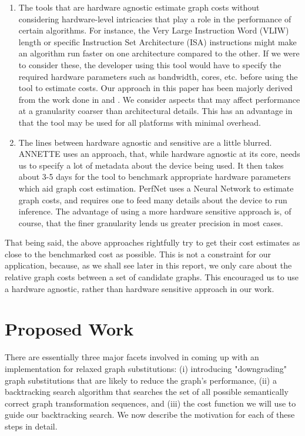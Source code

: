 \documentclass[12pt,a4paper,twoside,openright,bibliography=totocnumbered]{report}
\begin{document}
\begin{enumerate}
    \item The tools that are hardware agnostic estimate graph costs without considering hardware-level intricacies that play a role in the performance of certain algorithms. For instance, the Very Large Instruction Word (VLIW) length or specific Instruction Set Architecture (ISA) instructions might make an algorithm run faster on one architecture compared to the other. If we were to consider these, the developer using this tool would have to specify the required hardware parameters such as bandwidth, cores, etc. before using the tool to estimate costs. Our approach in this paper has been majorly derived from the work done in \cite{qi2017paleo} and \cite{osterwind2022hardware}. We consider aspects that may affect performance at a granularity coarser than architectural details. This has an advantage in that the tool may be used for all platforms with minimal overhead. 
    \item The lines between hardware agnostic and sensitive are a little blurred. ANNETTE \cite{wess2020annette} uses an approach, that, while hardware agnostic at its core, needs us to specify a lot of metadata about the device being used. It then takes about 3-5 days for the tool to benchmark appropriate hardware parameters which aid graph cost estimation. PerfNet \cite{wang2020perfnet} uses a Neural Network to estimate graph costs, and requires one to feed many details about the device to run inference. The advantage of using a more hardware sensitive approach is, of course, that the finer granularity lends us greater precision in most cases. 
\end{enumerate}

That being said, the above approaches rightfully try to get their cost estimates as close to the benchmarked cost as possible. This is not a constraint for our application, because, as we shall see later in this report, we only care about the relative graph costs between a set of candidate graphs. This encouraged us to use a hardware agnostic, rather than hardware sensitive approach in our work.


\chapter{Proposed Work}

There are essentially three major facets involved in coming up with an implementation for relaxed graph substitutions: (i) introducing "downgrading" graph substitutions that are likely to reduce the graph's performance, (ii) a backtracking search algorithm that searches the set of all possible semantically correct graph transformation sequences, and (iii) the cost function we will use to guide our backtracking search. We now describe the motivation for each of these steps in detail.
\end{document}
